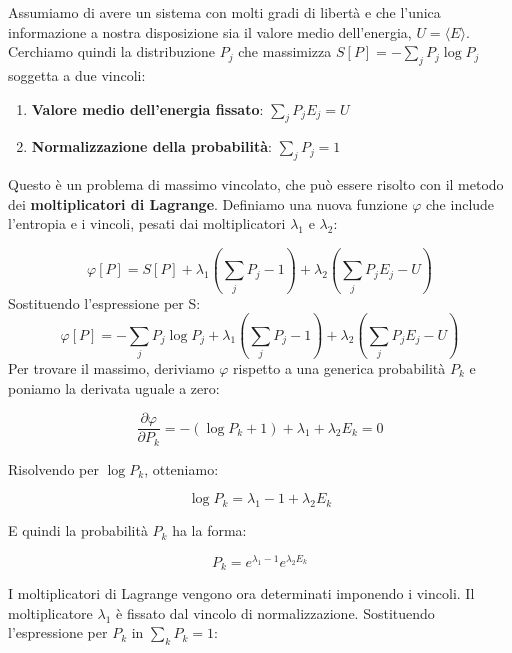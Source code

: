 Assumiamo di avere un sistema con molti gradi di libertà e che l'unica informazione a nostra disposizione sia il valore medio dell'energia, $U = \langle E \rangle$. Cerchiamo quindi la distribuzione $P_j$ che massimizza $S[P] = -\sum_j P_j \log P_j$ soggetta a due vincoli:
\begin{enumerate}
    \item \textbf{Valore medio dell'energia fissato}: $\sum_{j} P_j E_j = U$
    \item \textbf{Normalizzazione della probabilità}: $\sum_{j} P_j = 1$
\end{enumerate}

Questo è un problema di massimo vincolato, che può essere risolto con il metodo dei \textbf{moltiplicatori di Lagrange}. Definiamo una nuova funzione $\varphi$ che include l'entropia e i vincoli, pesati dai moltiplicatori $\lambda_1$ e $\lambda_2$:

\begin{equation}
\varphi[P] = S[P] + \lambda_1 \left(\sum_j P_j - 1\right) + \lambda_2 \left(\sum_j P_j E_j - U\right)
\end{equation}
Sostituendo l'espressione per S:
\begin{equation}
\varphi[P] = -\sum_j P_j \log P_j + \lambda_1 \left(\sum_j P_j - 1\right) + \lambda_2 \left(\sum_j P_j E_j - U\right)
\end{equation}
Per trovare il massimo, deriviamo $\varphi$ rispetto a una generica probabilità $P_k$ e poniamo la derivata uguale a zero:

\begin{equation}
\frac{\partial \varphi}{\partial P_k} = -(\log P_k + 1) + \lambda_1 + \lambda_2 E_k = 0
\end{equation}

Risolvendo per $\log P_k$, otteniamo:

\begin{equation}
\log P_k = \lambda_1 - 1 + \lambda_2 E_k
\end{equation}

E quindi la probabilità $P_k$ ha la forma:

\begin{equation}
P_k = e^{\lambda_1 - 1} e^{\lambda_2 E_k}
\end{equation}

I moltiplicatori di Lagrange vengono ora determinati imponendo i vincoli.
Il moltiplicatore $\lambda_1$ è fissato dal vincolo di normalizzazione. Sostituendo l'espressione per $P_k$ in $\sum_k P_k = 1$:

